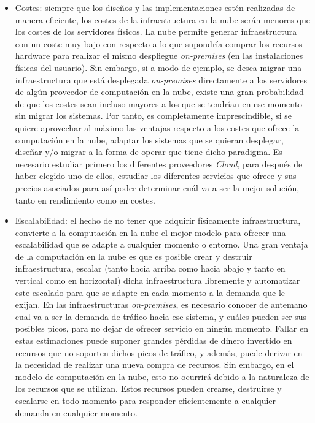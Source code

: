 \documentclass[../../memoria.tex]{subfiles}
\begin{document}
\begin{itemize}
    \item Costes: siempre que los diseños y las implementaciones estén realizadas de manera eficiente, los costes de la infraestructura en la nube serán menores que los costes de los servidores físicos. La nube permite generar infraestructura con un coste muy bajo con respecto a lo que supondría comprar los recursos hardware para realizar el mismo despliegue \textit{on-premises} (en las instalaciones físicas del usuario). Sin embargo, si a modo de ejemplo, se desea migrar una infraestructura que está desplegada \textit{on-premises} directamente a los servidores de algún proveedor de computación en la nube, existe una gran probabilidad de que los costes sean incluso mayores a los que se tendrían en ese momento sin migrar los sistemas. Por tanto, es completamente imprescindible, si se quiere aprovechar al máximo las ventajas respecto a los costes que ofrece la computación en la nube, adaptar los sistemas que se quieran desplegar, diseñar y/o migrar a la forma de operar que tiene dicho paradigma. Es necesario estudiar primero los diferentes proveedores \textit{Cloud}, para después de haber elegido uno de ellos, estudiar los diferentes servicios que ofrece y sus precios asociados para así poder determinar cuál va a ser la mejor solución, tanto en rendimiento como en costes.

    \item Escalabilidad: el hecho de no tener que adquirir físicamente infraestructura, convierte a la computación en la nube el mejor modelo para ofrecer una escalabilidad que se adapte a cualquier momento o entorno. Una gran ventaja de la computación en la nube es que es posible crear y destruir infraestructura, escalar (tanto hacia arriba como hacia abajo y tanto en vertical como en horizontal) dicha infraestructura libremente y automatizar este escalado para que se adapte en cada momento a la demanda que le exijan. En las infraestructuras \textit{on-premises}, es necesario conocer de antemano cual va a ser la demanda de tráfico hacia ese sistema, y cuáles pueden ser sus posibles picos, para no dejar de ofrecer servicio en ningún momento. Fallar en estas estimaciones puede suponer grandes pérdidas de dinero invertido en recursos que no soporten dichos picos de tráfico, y además, puede derivar en la necesidad de realizar una nueva compra de recursos. Sin embargo, en el modelo de computación en la nube, esto no ocurrirá debido a la naturaleza de los recursos que se utilizan. Estos recursos pueden crearse, destruirse y escalarse en todo momento para responder eficientemente a cualquier demanda en cualquier momento.


\end{itemize}
\end{document}
